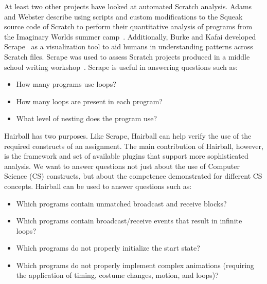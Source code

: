 At least two other projects have looked at automated Scratch analysis.  Adams
and Webster describe using scripts and custom modifications to the Squeak
source code of Scratch to perform their quantitative analysis of programs from
the Imaginary Worlds summer camp~\cite{Adams:2012:SLP:2157136.2157319}.
Additionally, Burke and Kafai developed Scrape~\cite{scrape-poster} as a
visualization tool to aid humans in understanding patterns across Scratch
files. Scrape was used to assess Scratch projects produced in a middle school
writing workshop~\cite{Burke:2012:WWY:2157136.2157264}. Scrape is useful in
answering questions such as:
\begin{itemize}
\vspace*{-.025in}
\item How many programs use loops?
\vspace*{-.025in}
\item How  many loops are present in each program?
\vspace*{-.025in}
\item What level of nesting does the program use?
\vspace*{-.025in}
\end{itemize}

Hairball has two purposes.  Like Scrape, Hairball can help verify the use of
the required constructs of an assignment.  The main contribution of Hairball,
however, is the framework and set of available plugins that support more
sophisticated analysis.  We want to answer questions not just about the use of
Computer Science (CS) constructs, but about the competence demonstrated for
different CS concepts. Hairball can be used to answer questions such as:
\begin{itemize}
\vspace*{-.025in}
\item Which programs contain unmatched broadcast and receive blocks?
\vspace*{-.025in}
\item Which programs contain broadcast/receive events that result in infinite
  loops?
\vspace*{-.025in}
\item Which programs do not properly initialize the start state?
\vspace*{-.025in}
\item Which programs do not properly implement complex animations (requiring
  the application of timing, costume changes, motion, and loops)?
\vspace*{-.025in}
\end{itemize}
\vspace*{0.25in}

